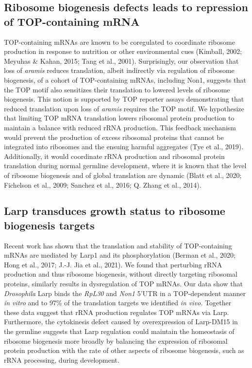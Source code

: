 \documentclass[12pt,oneside]{reedthesis}
\begin{document}
\hypertarget{ribosome-biogenesis-defects-leads-to-repression-of-top-containing-mrna}{%
\subsection{Ribosome biogenesis defects leads to repression of TOP-containing mRNA}\label{ribosome-biogenesis-defects-leads-to-repression-of-top-containing-mrna}}

TOP-containing mRNAs are known to be coregulated to coordinate ribosome
production in response to nutrition or other environmental cues
(Kimball, 2002; Meyuhas \& Kahan, 2015; Tang et al., 2001). Surprisingly, our observation
that loss of \emph{aramis} reduces translation, albeit indirectly via
regulation of ribosome biogenesis, of a cohort of TOP-containing mRNAs,
including Non1, suggests that the TOP motif also sensitizes their
translation to lowered levels of ribosome biogenesis. This notion is
supported by TOP reporter assays demonstrating that reduced translation
upon loss of \emph{aramis} requires the TOP motif. We hypothesize that
limiting TOP mRNA translation lowers ribosomal protein production to
maintain a balance with reduced rRNA production. This feedback mechanism
would prevent the production of excess ribosomal proteins that cannot be
integrated into ribosomes and the ensuing harmful aggregates
(Tye et al., 2019). Additionally, it would
coordinate rRNA production and ribosomal protein translation during
normal germline development, where it is known that the level of
ribosome biogenesis and of global translation are dynamic
(Blatt et al., 2020; Fichelson et al., 2009; Sanchez et al., 2016; Q. Zhang et al., 2014).

\hypertarget{larp-transduces-growth-status-to-ribosome-biogenesis-targets}{%
\subsection{Larp transduces growth status to ribosome biogenesis targets}\label{larp-transduces-growth-status-to-ribosome-biogenesis-targets}}

Recent work has shown that the translation and stability of
TOP-containing mRNAs are mediated by Larp1 and its phosphorylation
(Berman et al., 2020; Hong et al., 2017; J.-J. Jia et al., 2021). We found that perturbing rRNA production
and thus ribosome biogenesis, without directly targeting ribosomal
proteins, similarly results in dysregulation of TOP mRNAs. Our data show
that \emph{Drosophila} Larp binds the \emph{RpL30} and \emph{Non1} 5'UTR in a
TOP-dependent manner \emph{in vitro} and to 97\% of the translation targets we
identified \emph{in vivo.} Together these data suggest that rRNA production
regulates TOP mRNAs via Larp. Furthermore, the cytokinesis defect caused
by overexpression of Larp-DM15 in the germline suggests that Larp
regulation could maintain the homeostasis of ribosome biogenesis more
broadly by balancing the expression of ribosomal protein production with
the rate of other aspects of ribosome biogenesis, such as rRNA
processing, during development.
\end{document}
